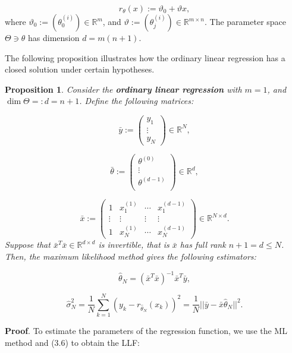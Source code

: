 \documentclass{report}
\newtheorem{proposition}{Proposition}[chapter]
\begin{document}
\begin{equation}
r_\theta(x) :=  \vartheta_0 + \vartheta x,
\end{equation}
where $\vartheta_0 := (\theta_0^{(i)}) \in \mathbb{R}^m$, and $\vartheta := (\theta_j^{(i)}) \in \mathbb{R}^{m \times n}$. The parameter space $\Theta \ni \theta$ has dimension $d = m(n+1)$.

The following proposition illustrates how the ordinary linear regression has a closed solution under certain hypotheses.

\begin{proposition}
Consider the \textbf{ordinary linear regression} with $m=1$, and $\dim \Theta =: d = n + 1$. Define the following matrices:

\begin{equation}
\bar{y} := \begin{pmatrix}y_1\\
\vdots\\
y_N
\end{pmatrix} \in \mathbb{R}^N,
\end{equation}

\begin{equation}
\bar{\theta} := \begin{pmatrix}\theta^{(0)}\\
\vdots\\
\theta^{(d-1)}\\
\end{pmatrix} \in \mathbb{R}^{d},
\end{equation}

\begin{equation}
\bar{x} := \begin{pmatrix}
1 & x^{(1)}_1 & \cdots & x^{(d-1)}_1\\
\vdots & \vdots  & \vdots & \vdots \\
1 & x^{(1)}_N  &\cdots & x^{(d-1)}_N
\end{pmatrix} \in \mathbb{R}^{N \times d}.
\end{equation}
Suppose that $\bar{x}^T\bar{x} \in \mathbb{R}^{d \times d}$ is invertible, that is $\bar{x}$ has full rank $n + 1 = d \leq N$. Then, the maximum likelihood method gives the following estimators:

\begin{equation}
\hat{\theta}_N = (\bar{x}^T\bar{x})^{-1}\bar{x}^T\bar{y},
\end{equation}

\begin{equation}
\hat{\sigma}_N^2 = \frac{1}{N}\sum_{k=1}^{N}(y_k-r_{\hat{\theta}_N}(x_k))^2 = \frac{1}{N}||\bar{y} -\bar{x}\hat{\theta}_N||^2.
\end{equation}
\end{proposition}
\textbf{Proof}. To estimate the parameters of the regression function, we use the ML method and (3.6) to obtain the LLF:
\end{document}
